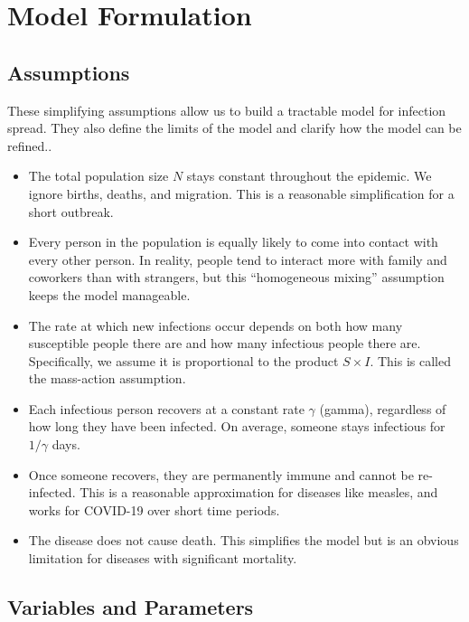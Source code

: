 \documentclass[11pt]{article}
\begin{document}
\section{Model Formulation}

\subsection{Assumptions}

These simplifying assumptions allow us to build a tractable model for infection spread. They also define the limits of the model and clarify how the model can be refined..

\begin{itemize}
    \item The total population size $N$ stays constant throughout the epidemic. We ignore births, deaths, and migration. This is a reasonable simplification for a short outbreak.
    \item Every person in the population is equally likely to come into contact with every other person. In reality, people tend to interact more with family and coworkers than with strangers, but this ``homogeneous mixing'' assumption keeps the model manageable.
    \item The rate at which new infections occur depends on both how many susceptible people there are and how many infectious people there are. Specifically, we assume it is proportional to the product $S \times I$. This is called the mass-action assumption.
    \item Each infectious person recovers at a constant rate $\gamma$ (gamma), regardless of how long they have been infected. On average, someone stays infectious for $1/\gamma$ days.
    \item Once someone recovers, they are permanently immune and cannot be re-infected. This is a reasonable approximation for diseases like measles, and works for COVID-19 over short time periods.
    \item The disease does not cause death. This simplifies the model but is an obvious limitation for diseases with significant mortality.
\end{itemize}

\subsection{Variables and Parameters}
\end{document}
